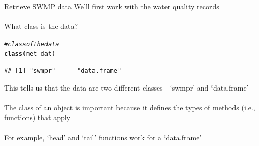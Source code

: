 \documentclass[xcolor=svgnames]{beamer}\usepackage[]{graphicx}\usepackage[]{color}
\makeatletter
\newcommand{\hlcom}[1]{\textcolor[rgb]{0.678,0.584,0.686}{\textit{#1}}}%
\newcommand{\hlstd}[1]{\textcolor[rgb]{0.345,0.345,0.345}{#1}}%
\newcommand{\hlkwd}[1]{\textcolor[rgb]{0.737,0.353,0.396}{\textbf{#1}}}%
\newenvironment{kframe}{%
 \def\at@end@of@kframe{}%
 \ifinner\ifhmode%
  \def\at@end@of@kframe{\end{minipage}}%
  \begin{minipage}{\columnwidth}%
 \fi\fi%
 \def\FrameCommand##1{\hskip\@totalleftmargin \hskip-\fboxsep
 \colorbox{shadecolor}{##1}\hskip-\fboxsep
     \hskip-\linewidth \hskip-\@totalleftmargin \hskip\columnwidth}%
 \MakeFramed {\advance\hsize-\width
   \@totalleftmargin\z@ \linewidth\hsize
   \@setminipage}}%
 {\par\unskip\endMakeFramed%
 \at@end@of@kframe}
\newenvironment{knitrout}{}{} %
\makeatother
\begin{document}
\begin{frame}{Retrieve SWMP data}
We'll first work with the water quality records\\~\\
What class is the data?
\begin{knitrout}\scriptsize
{}\color{fgcolor}\begin{kframe}
\begin{alltt}
\hlcom{# class of the data}
\hlkwd{class}\hlstd{(met_dat)}
\end{alltt}
\begin{verbatim}
## [1] "swmpr"      "data.frame"
\end{verbatim}
\end{kframe}
\end{knitrout}
This tells us that the data are two different classes - `swmpr' and `data.frame'\\~\\
The class of an object is important because it defines the types of methods (i.e., functions) that apply\\~\\
For example, `head' and `tail' functions work for a `data.frame'
\end{frame}
\end{document}
